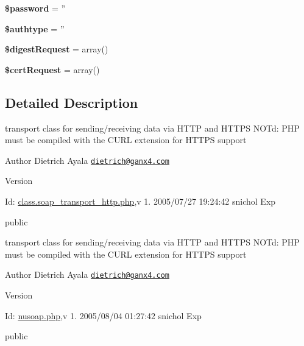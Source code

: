 \begin{DoxyCompactItemize}
\item 
\hypertarget{classsoap__transport__http_a607686ef9f99ea7c42f4f3dd3dbb2b0d}{{\bfseries \$password} = ''}\label{classsoap__transport__http_a607686ef9f99ea7c42f4f3dd3dbb2b0d}

\item 
\hypertarget{classsoap__transport__http_ae81871b02c5845eb3a1071eb24e1f29c}{{\bfseries \$authtype} = ''}\label{classsoap__transport__http_ae81871b02c5845eb3a1071eb24e1f29c}

\item 
\hypertarget{classsoap__transport__http_ad098598a3adf68983dbf72c92cd594dc}{{\bfseries \$digest\-Request} = array()}\label{classsoap__transport__http_ad098598a3adf68983dbf72c92cd594dc}

\item 
\hypertarget{classsoap__transport__http_adcbe9a77644bad97ed599d1651bd2719}{{\bfseries \$cert\-Request} = array()}\label{classsoap__transport__http_adcbe9a77644bad97ed599d1651bd2719}

\end{DoxyCompactItemize}


\subsection{Detailed Description}
transport class for sending/receiving data via H\-T\-T\-P and H\-T\-T\-P\-S N\-O\-Td\-: P\-H\-P must be compiled with the C\-U\-R\-L extension for H\-T\-T\-P\-S support

\begin{DoxyAuthor}{Author}
Dietrich Ayala \href{mailto:dietrich@ganx4.com}{\tt dietrich@ganx4.\-com} 
\end{DoxyAuthor}
\begin{DoxyVersion}{Version}

\end{DoxyVersion}
\begin{DoxyParagraph}{Id\-:}
\hyperlink{class_8soap__transport__http_8php_source}{class.\-soap\-\_\-transport\-\_\-http.\-php},v 1. 2005/07/27 19\-:24\-:42 snichol Exp 
\end{DoxyParagraph}
public

transport class for sending/receiving data via H\-T\-T\-P and H\-T\-T\-P\-S N\-O\-Td\-: P\-H\-P must be compiled with the C\-U\-R\-L extension for H\-T\-T\-P\-S support

\begin{DoxyAuthor}{Author}
Dietrich Ayala \href{mailto:dietrich@ganx4.com}{\tt dietrich@ganx4.\-com} 
\end{DoxyAuthor}
\begin{DoxyVersion}{Version}

\end{DoxyVersion}
\begin{DoxyParagraph}{Id\-:}
\hyperlink{nusoap_8php_source}{nusoap.\-php},v 1. 2005/08/04 01\-:27\-:42 snichol Exp 
\end{DoxyParagraph}
public 

